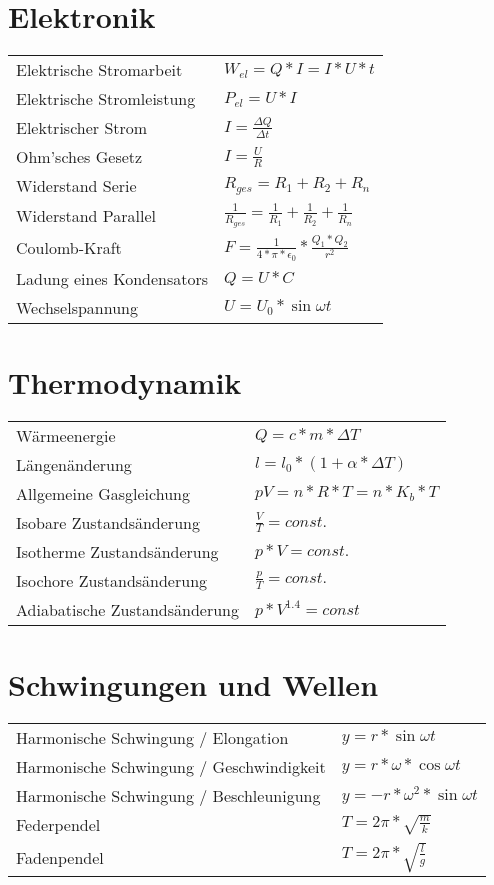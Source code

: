 \documentclass[12pt,a4paper]{paper}
\begin{document}
\section{Elektronik}
\begin{tabularx}{\textwidth}{X|X}
	Elektrische Stromarbeit & $ W_{el} = Q * I = I * U * t$\\
	Elektrische Stromleistung & $P_{el} = U * I$\\
	Elektrischer Strom & $I = \frac{\Delta Q}{\Delta t}$\\
	Ohm'sches Gesetz & $I=\frac{U}{R}$\\
	Widerstand Serie & $R_{ges} = R_1 + R_2 + R_n$\\
	Widerstand Parallel & $\frac{1}{R_{ges}} = \frac{1}{R_1} + \frac{1}{R_2} + \frac{1}{R_n}$\\
	Coulomb-Kraft & $F = \frac{1}{4*\pi * \epsilon_{0}} * \frac{Q_1 * Q_2}{r^2}$\\
	Ladung eines Kondensators & $Q = U * C$\\
	Wechselspannung & $U = U_0 * \sin{\omega t}$\\
\end{tabularx}
\section{Thermodynamik}
\begin{tabularx}{\textwidth}{X|X}
	Wärmeenergie & $Q=c*m*\Delta T$\\
	Längenänderung & $l = l_0 * (1 + \alpha * \Delta T)$\\
	Allgemeine Gasgleichung & $pV = n*R*T = n *K_b * T$\\
	Isobare Zustandsänderung & $\frac{V}{T} = const.$\\
	Isotherme Zustandsänderung & $p*V = const.$\\
	Isochore Zustandsänderung & $\frac{p}{T} = const.$\\
	Adiabatische Zustandsänderung & $p * V^{1.4} = const$
\end{tabularx}
\section{Schwingungen und Wellen}
\begin{tabularx}{\textwidth}{X|X}
Harmonische Schwingung / Elongation & $y = r * \sin{\omega t}$\\
Harmonische Schwingung / Geschwindigkeit & $y = r * \omega * \cos{\omega t}$\\
Harmonische Schwingung / Beschleunigung & $y = -r * \omega^2 * \sin{\omega t}$\\
Federpendel & $T = 2\pi * \sqrt{\frac{m}{k}}$\\
Fadenpendel & $T= 2\pi * \sqrt{\frac{l}{g}}$\\
\end{tabularx}
\end{document}
